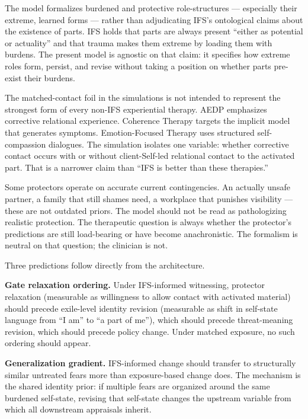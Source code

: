 \documentclass[11pt,a4paper]{article}
\makeatletter
\renewcommand\subsection{\@startsection{subsection}{2}{0pt}{1.8ex plus 0.5ex minus 0.2ex}{0.8ex plus 0.2ex}{\normalsize\bfseries}}
\makeatother
\begin{document}
The model formalizes burdened and protective role-structures ---
especially their extreme, learned forms --- rather than adjudicating
IFS's ontological claims about the existence of parts. IFS holds that
parts are always present ``either as potential or actuality'' and that
trauma makes them extreme by loading them with burdens. The present
model is agnostic on that claim: it specifies how extreme roles form,
persist, and revise without taking a position on whether parts pre-exist
their burdens.

The matched-contact foil in the simulations is not intended to represent
the strongest form of every non-IFS experiential therapy. AEDP
emphasizes corrective relational experience. Coherence Therapy targets
the implicit model that generates symptoms. Emotion-Focused Therapy uses
structured self-compassion dialogues. The simulation isolates one
variable: whether corrective contact occurs with or without
client-Self-led relational contact to the activated part. That is a
narrower claim than ``IFS is better than these therapies.''

Some protectors operate on accurate current contingencies. An actually
unsafe partner, a family that still shames need, a workplace that
punishes visibility --- these are not outdated priors. The model should
not be read as pathologizing realistic protection. The therapeutic
question is always whether the protector's predictions are still
load-bearing or have become anachronistic. The formalism is neutral on
that question; the clinician is not.

\subsection{Empirical predictions}\label{empirical-predictions}

Three predictions follow directly from the architecture.

\textbf{Gate relaxation ordering.} Under IFS-informed witnessing,
protector relaxation (measurable as willingness to allow contact with
activated material) should precede exile-level identity revision
(measurable as shift in self-state language from ``I am'' to ``a part of
me''), which should precede threat-meaning revision, which should
precede policy change. Under matched exposure, no such ordering should
appear.

\textbf{Generalization gradient.} IFS-informed change should transfer to
structurally similar untreated fears more than exposure-based change
does. The mechanism is the shared identity prior: if multiple fears are
organized around the same burdened self-state, revising that self-state
changes the upstream variable from which all downstream appraisals
inherit.
\end{document}
